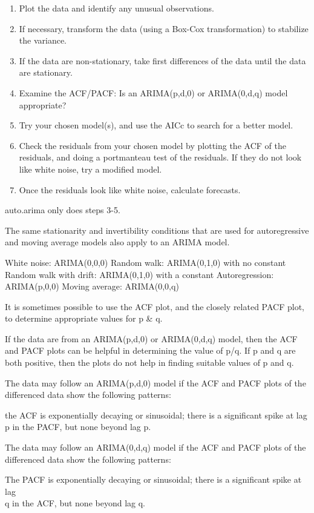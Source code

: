 \documentclass[]{book}
\begin{document}
\begin{enumerate}
\def\labelenumi{\arabic{enumi}.}
\item
  Plot the data and identify any unusual observations.
\item
  If necessary, transform the data (using a Box-Cox transformation) to
  stabilize the variance.
\item
  If the data are non-stationary, take first differences of the data
  until the data are stationary.
\item
  Examine the ACF/PACF: Is an ARIMA(p,d,0) or ARIMA(0,d,q) model
  appropriate?
\item
  Try your chosen model(s), and use the AICc to search for a better
  model.
\item
  Check the residuals from your chosen model by plotting the ACF of the
  residuals, and doing a portmanteau test of the residuals. If they do
  not look like white noise, try a modified model.
\item
  Once the residuals look like white noise, calculate forecasts.
\end{enumerate}

auto.arima only does steps 3-5.

The same stationarity and invertibility conditions that are used for
autoregressive and moving average models also apply to an ARIMA model.

White noise: ARIMA(0,0,0) Random walk: ARIMA(0,1,0) with no constant
Random walk with drift: ARIMA(0,1,0) with a constant Autoregression:
ARIMA(p,0,0) Moving average: ARIMA(0,0,q)

It is sometimes possible to use the ACF plot, and the closely related
PACF plot, to determine appropriate values for p \& q.

If the data are from an ARIMA(p,d,0) or ARIMA(0,d,q) model, then the ACF
and PACF plots can be helpful in determining the value of p/q. If p and
q are both positive, then the plots do not help in finding suitable
values of p and q.

The data may follow an ARIMA(p,d,0) model if the ACF and PACF plots of
the differenced data show the following patterns:

the ACF is exponentially decaying or sinusoidal; there is a significant
spike at lag p in the PACF, but none beyond lag p.

The data may follow an ARIMA(0,d,q) model if the ACF and PACF plots of
the differenced data show the following patterns:

The PACF is exponentially decaying or sinusoidal; there is a significant
spike at lag\\
q in the ACF, but none beyond lag q.
\end{document}
